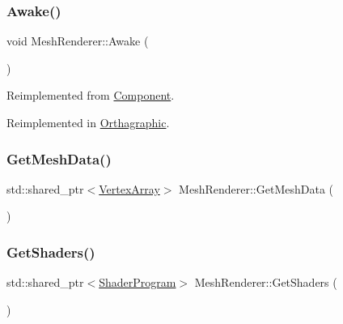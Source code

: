 \subsubsection{\texorpdfstring{Awake()}{Awake()}}
{\footnotesize\ttfamily void Mesh\+Renderer\+::\+Awake (\begin{DoxyParamCaption}{ }\end{DoxyParamCaption})\hspace{0.3cm}{\ttfamily [virtual]}}



Reimplemented from \mbox{\hyperlink{class_component}{Component}}.



Reimplemented in \mbox{\hyperlink{class_orthagraphic_a62f9d1b5d54623252bc3d15eba1e7181}{Orthagraphic}}.

\mbox{\label{class_mesh_renderer_a2924155f99c9276a2089ff618f9016c8}} 
\subsubsection{\texorpdfstring{Get\+Mesh\+Data()}{GetMeshData()}}
{\footnotesize\ttfamily std\+::shared\+\_\+ptr$<$\mbox{\hyperlink{class_vertex_array}{Vertex\+Array}}$>$ Mesh\+Renderer\+::\+Get\+Mesh\+Data (\begin{DoxyParamCaption}{ }\end{DoxyParamCaption})\hspace{0.3cm}{\ttfamily [inline]}}

\mbox{\label{class_mesh_renderer_a07be90e4601d54e0870854cc91dc018c}} 
\subsubsection{\texorpdfstring{Get\+Shaders()}{GetShaders()}}
{\footnotesize\ttfamily std\+::shared\+\_\+ptr$<$\mbox{\hyperlink{class_shader_program}{Shader\+Program}}$>$ Mesh\+Renderer\+::\+Get\+Shaders (\begin{DoxyParamCaption}{ }\end{DoxyParamCaption})\hspace{0.3cm}{\ttfamily [inline]}}

